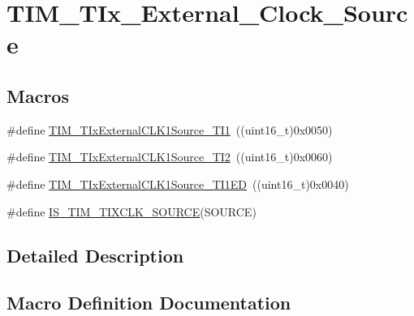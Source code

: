 \hypertarget{group___t_i_m___t_ix___external___clock___source}{}\section{T\+I\+M\+\_\+\+T\+Ix\+\_\+\+External\+\_\+\+Clock\+\_\+\+Source}
\label{group___t_i_m___t_ix___external___clock___source}
\subsection*{Macros}
\begin{DoxyCompactItemize}
\item 
\#define \mbox{\hyperlink{group___t_i_m___t_ix___external___clock___source_ga237daecde6e1f75509acc80a9ccce820}{T\+I\+M\+\_\+\+T\+Ix\+External\+C\+L\+K1\+Source\+\_\+\+T\+I1}}~((uint16\+\_\+t)0x0050)
\item 
\#define \mbox{\hyperlink{group___t_i_m___t_ix___external___clock___source_gafa3c6345a7e1c3668b2e7e4d61a79491}{T\+I\+M\+\_\+\+T\+Ix\+External\+C\+L\+K1\+Source\+\_\+\+T\+I2}}~((uint16\+\_\+t)0x0060)
\item 
\#define \mbox{\hyperlink{group___t_i_m___t_ix___external___clock___source_gaa1a749bc38d434902b69a45d50ee0889}{T\+I\+M\+\_\+\+T\+Ix\+External\+C\+L\+K1\+Source\+\_\+\+T\+I1\+ED}}~((uint16\+\_\+t)0x0040)
\item 
\#define \mbox{\hyperlink{group___t_i_m___t_ix___external___clock___source_gabfa9cd6cf6e9df4bff8d6cdf16c6b374}{I\+S\+\_\+\+T\+I\+M\+\_\+\+T\+I\+X\+C\+L\+K\+\_\+\+S\+O\+U\+R\+CE}}(S\+O\+U\+R\+CE)
\end{DoxyCompactItemize}


\subsection{Detailed Description}


\subsection{Macro Definition Documentation}
\mbox{\label{group___t_i_m___t_ix___external___clock___source_gabfa9cd6cf6e9df4bff8d6cdf16c6b374}} 
